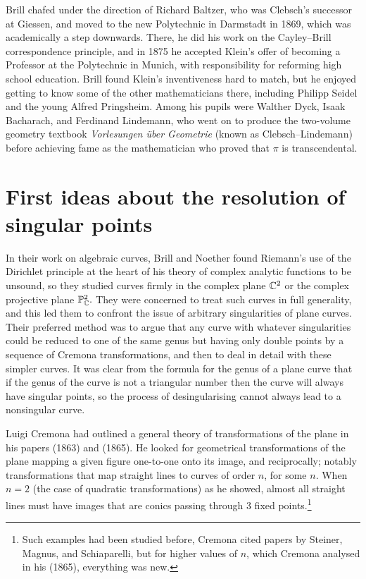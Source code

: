 Brill  chafed under the direction of  Richard Baltzer, who was Clebsch's successor at Giessen,  and moved to the new Polytechnic in Darmstadt in 1869, which was academically a step downwards. There, he did his work on the Cayley--Brill correspondence principle, and in 1875  he accepted Klein's offer of becoming a Professor at the Polytechnic in Munich, with responsibility for reforming high school education.  Brill found Klein's inventiveness hard to match, but he enjoyed getting to know some of the other mathematicians there, including Philipp Seidel and the young Alfred Pringsheim. Among his pupils were Walther Dyck, Isaak Bacharach, and Ferdinand Lindemann, who went on to produce the two-volume geometry textbook \emph{Vorlesungen \"uber Geometrie} (known as Clebsch--Lindemann) before achieving fame as the mathematician who proved that $\pi$ is transcendental.


\section{First ideas about the resolution of singular points}
In their work on algebraic curves, Brill and Noether found Riemann's use of the Dirichlet principle at the heart of his theory of complex analytic functions to be unsound, so they studied curves firmly in the complex plane $\CC^2$ or the complex projective plane $\PP_\CC^2.$ They were concerned to treat such curves in full generality, and this led them to confront the issue of arbitrary singularities of plane curves. Their preferred method was to argue that any curve with whatever singularities could be reduced to one of the same genus but having only double points by a sequence of Cremona transformations, and then to deal in detail with these simpler curves. It was clear from the formula for the genus of a plane curve that if the genus of the curve is not a triangular number then the curve will always have singular points, so the process of desingularising cannot always lead to a nonsingular curve.

Luigi Cremona had  outlined a general theory of transformations of the plane in his papers (1863) and (1865). He looked for geometrical transformations of the plane mapping a given figure one-to-one onto its image, and reciprocally; notably  transformations that map straight lines to curves of order $n$, for some $n.$ When $n=2$ (the case of quadratic transformations)  as he showed, almost all straight lines must have images that are conics passing through 3 fixed points.\footnote{Such examples had been studied before, Cremona  cited papers by Steiner, Magnus, and Schiaparelli, but for higher values of $n$, which Cremona analysed in his (1865), everything was new.}




